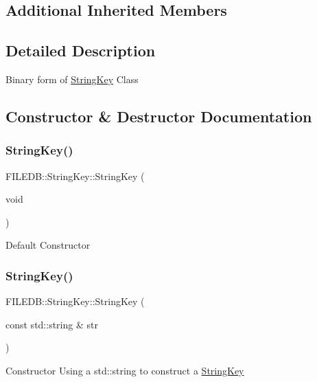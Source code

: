 \subsection*{Additional Inherited Members}


\subsection{Detailed Description}
Binary form of \mbox{\hyperlink{classFILEDB_1_1StringKey}{String\+Key}} Class 

\subsection{Constructor \& Destructor Documentation}
\mbox{\label{classFILEDB_1_1StringKey_ada360436c743f4464e82b0cb2757d229}} 
\subsubsection{\texorpdfstring{StringKey()}{StringKey()}\hspace{0.1cm}{\footnotesize\ttfamily [1/12]}}
{\footnotesize\ttfamily F\+I\+L\+E\+D\+B\+::\+String\+Key\+::\+String\+Key (\begin{DoxyParamCaption}\item[{void}]{ }\end{DoxyParamCaption})}

Default Constructor \mbox{\label{classFILEDB_1_1StringKey_a18edda7351ebadd52d18bcde2cc8a71c}} 
\subsubsection{\texorpdfstring{StringKey()}{StringKey()}\hspace{0.1cm}{\footnotesize\ttfamily [2/12]}}
{\footnotesize\ttfamily F\+I\+L\+E\+D\+B\+::\+String\+Key\+::\+String\+Key (\begin{DoxyParamCaption}\item[{const std\+::string \&}]{str }\end{DoxyParamCaption})}

Constructor Using a std\+::string to construct a \mbox{\hyperlink{classFILEDB_1_1StringKey}{String\+Key}} \mbox{\label{classFILEDB_1_1StringKey_a7710b1f6cafd04e1e178d24019e81ae5}} 
